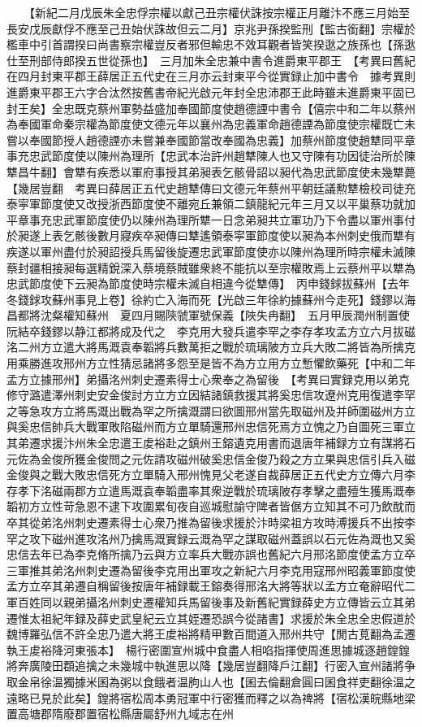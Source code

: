 　　【新紀二月戊辰朱全忠俘宗權以獻己丑宗權伏誅按宗權正月離汴不應三月始至長安戊辰獻俘不應至己丑始伏誅故但云二月】京兆尹孫揆監刑【監古銜翻】宗權於檻車中引首謂揆曰尚書察宗權豈反者邪但輸忠不效耳觀者皆笑揆逖之族孫也【孫逖仕至刑部侍郎揆五世從孫也】　三月加朱全忠兼中書令進爵東平郡王　【考異曰舊紀在四月封東平郡王薛居正五代史在三月亦云封東平今從實録止加中書令　據考異則進爵東平郡王六字合汰然按舊書帝紀光啟元年封全忠沛郡王此時雖未進爵東平固已封王矣】全忠既克蔡州軍勢益盛加奉國節度使趙德諲中書令【僖宗中和二年以蔡州為奉國軍命秦宗權為節度使文德元年以襄州為忠義軍命趙德諲為節度使宗權既亡未嘗以奉國節授人趙德諲亦未嘗兼奉國節當改奉國為忠義】加蔡州節度使趙犨同平章事充忠武節度使以陳州為理所【忠武本治許州趙犨陳人也又守陳有功因徒治所於陳犨昌牛翻】會犨有疾悉以軍府事授其弟昶表乞骸骨詔以昶代為忠武節度使未幾犨薨【幾居豈翻　考異曰薛居正五代史趙犨傳曰文德元年蔡州平朝廷議勲犨檢校司徒充泰寜軍節度使又改授浙西節度使不離宛丘兼領二鎮龍紀元年三月又以平巢蔡功就加平章事充忠武軍節度使仍以陳州為理所犨一日念弟昶共立軍功乃下令盡以軍州事付於昶遂上表乞骸後數月寢疾卒昶傳曰犨遙領泰寜軍節度使以昶為本州刺史俄而犨有疾遂以軍州盡付於昶詔授兵馬留後旋遷忠武軍節度使亦以陳州為理所時宗權未滅陳蔡封疆相接昶每選精銳深入蔡境蔡賊雖衆終不能抗以至宗權敗焉上云蔡州平以犨為忠武節度使下云昶為節度使時宗權未滅自相違今從犨傳】　丙申錢銶拔蘇州【去年冬錢銶攻蘇州事見上卷】徐約亡入海而死【光啟三年徐約據蘇州今走死】錢鏐以海昌都將沈粲權知蘇州　夏四月賜陝虢軍號保義【陜失冉翻】　五月甲辰潤州制置使阮結卒錢鏐以静江都將成及代之　李克用大發兵遣李罕之李存孝攻孟方立六月拔磁洺二州方立遣大將馬溉袁奉韜將兵數萬拒之戰於琉璃陂方立兵大敗二將皆為所擒克用乘勝進攻邢州方立性猜忌諸將多怨至是皆不為方立用方立慙懼飲藥死【中和二年孟方立據邢州】弟攝洺州刺史遷素得士心衆奉之為留後　【考異曰實録克用以弟克修守潞遣澤州刺史安金俊討方立方立因結諸鎮救援其將奚忠信攻遼州克用復遣李罕之等急攻方立將馬溉出戰為罕之所擒溉謂曰欲圖邢州當先取磁州及并師圍磁州方立與奚忠信帥兵大戰軍敗陷磁州而方立單騎還邢州忠信死焉方立愧之乃自圖死三軍立其弟遷求援汴州朱全忠遣王䖍裕赴之鎮州王鎔遺克用書而退唐年補録方立有謀將石元佐為金俊所獲金俊問之元佐請攻磁州破奚忠信金俊乃殺之方立果與忠信引兵入磁金俊與之戰大敗忠信死方立單騎入邢州愧見父老遂自裁薛居正五代史方立傳六月李存孝下洺磁兩郡方立遣馬溉袁奉韜盡率其衆逆戰於琉璃陂存孝擊之盡殪生獲馬溉奉韜初方立性苛急恩不逮下攻圍累旬夜自巡城慰諭守陴者皆倨方立知其不可乃飲酖而卒其從弟洺州刺史遷素得士心衆乃推為留後求援於汴時梁祖方攻時溥援兵不出按李罕之攻下磁州進攻洺州乃擒馬溉實録云溉為罕之謀取磁州蓋誤以石元佐為溉也又奚忠信去年已為李克脩所擒乃云與方立率兵大戰亦誤也舊紀六月邢洺節度使孟方立卒三軍推其弟洺州刺史遷為留後李克用出軍攻之新紀六月李克用寇邢州昭義軍節度使孟方立卒其弟遷自稱留後按唐年補録載王鎔奏得邢洺大將等狀以孟方立奄辭昭代二軍百姓同以親弟攝洺州刺史遷權知兵馬留後事及新舊紀實録薛史方立傳皆云立其弟遷惟太祖紀年録及薛史武皇紀云立其姪遷恐誤今從諸書】求援於朱全忠全忠假道於魏博羅弘信不許全忠乃遣大將王䖍裕將精甲數百間道入邢州共守【閒古莧翻為孟遷執王䖍裕降河東張本】　楊行密圍宣州城中食盡人相啗指揮使周進思據城逐趙鍠鍠將奔廣陵田頵追擒之未幾城中執進思以降【幾居豈翻降戶江翻】行密入宣州諸將争取金帛徐温獨據米囷為粥以食餓者温朐山人也【囷去倫翻倉圓曰囷食祥吏翻徐温之遠略已見於此矣】鍠將宿松周本勇冠軍中行密獲而釋之以為禆將【宿松漢皖縣地梁置高塘郡隋廢郡置宿松縣唐屬舒州九域志在州